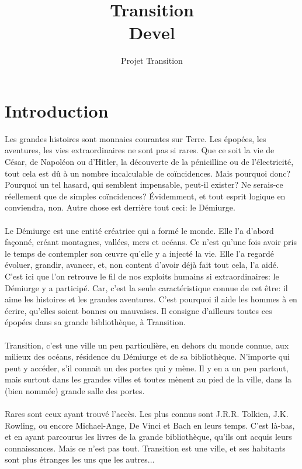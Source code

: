 \documentclass{book}
\title{Transition \\ Devel}
\author{Projet Transition}
\date{\oldstylenums{\insertdate}}
\begin{document}
\maketitle
\setcounter{tocdepth}{1} %
\renewcommand{\contentsname}{Sommaire} 
\tableofcontents

\newpage
\section*{Introduction}
Les grandes histoires sont monnaies courantes sur Terre. Les épopées, les aventures, les vies extraordinaires ne sont pas si rares. Que ce soit la  vie de César, de Napoléon ou d'Hitler, la découverte de la pénicilline ou de l’électricité, tout cela est dû à un nombre incalculable de coïncidences. Mais pourquoi donc? Pourquoi un tel hasard, qui semblent impensable, peut-il exister? Ne serais-ce réellement que de simples coïncidences?
Évidemment, et tout esprit logique en conviendra, non. Autre chose est derrière tout ceci: le Démiurge.
\\
\\
Le Démiurge est une entité créatrice qui a formé le monde. Elle l'a d'abord façonné, créant montagnes, vallées, mers et océans. Ce n'est qu'une fois avoir pris le temps de contempler son œuvre qu'elle y a injecté la vie. Elle l'a regardé évoluer, grandir, avancer, et, non content d'avoir déjà fait tout cela, l'a aidé.
\\
C'est ici que l'on retrouve le fil de nos exploits humains si extraordinaires: le Démiurge y a participé. Car, c'est la seule caractéristique connue de cet être: il aime les histoires et les grandes aventures. C'est pourquoi il aide les hommes à en écrire, qu'elles soient bonnes ou mauvaises.
Il consigne d'ailleurs toutes ces épopées dans sa grande bibliothèque, à Transition.
\\
\\
Transition, c'est une ville un peu particulière, en dehors du monde connue, aux milieux des océans, résidence du Démiurge et de sa bibliothèque. N'importe qui peut y accéder, s'il connait un des portes qui y mène. Il y en a un peu partout, mais surtout dans les grandes villes et toutes mènent au pied de la ville, dans la (bien nommée) grande salle des portes.
\\
\\
Rares sont ceux ayant trouvé l'accès. Les plus connus sont J.R.R. Tolkien, J.K. Rowling, ou encore Michael-Ange, De Vinci et Bach en leurs temps. C'est là-bas, et en ayant parcourus les livres de la grande bibliothèque, qu'ils ont acquis leurs connaissances. Mais ce n'est pas tout. Transition est une ville, et ses habitants sont plus étranges les uns que les autres...
\end{document}
